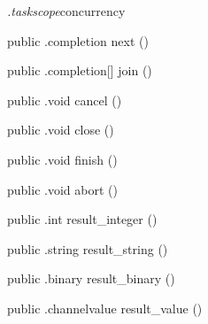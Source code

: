 \begin{CrexxClass}{\textit{.taskscope}}{concurrency}
\begin{Members}
    \Method
      {public}
      {.completion}
      {next}
      {()}

    \Method
      {public}
      {.completion[]}
      {join}
      {()}

    \Method
      {public}
      {.void}
      {cancel}
      {()}

    \Method
      {public}
      {.void}
      {close}
      {()}

    \Method
      {public}
      {.void}
      {finish}
      {()}

    \Method
      {public}
      {.void}
      {abort}
      {()}

    \Method
      {public}
      {.int}
      {result\_integer}
      {()}

    \Method
      {public}
      {.string}
      {result\_string}
      {()}

    \Method
      {public}
      {.binary}
      {result\_binary}
      {()}

    \Method
      {public}
      {.channelvalue}
      {result\_value}
      {()}

  \end{Members}
\end{CrexxClass}

